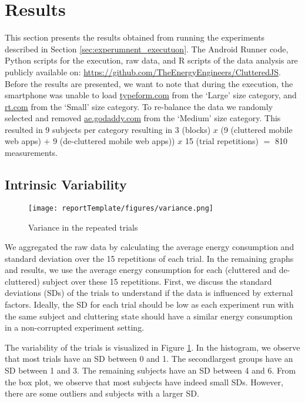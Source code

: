 \section{Results}\label{sec:results}

This section presents the results obtained from running the experiments described in Section \ref{sec:experumnent_executuon}. The Android Runner code, Python scripts for the execution, raw data, and R scripts of the data analysis are publicly available on:
\url{https://github.com/TheEnergyEngineers/ClutteredJS}. Before the results are presented, we want to note that during the execution, the smartphone was unable to load \url{typeform.com} from the `Large' size category, and \url{rt.com} from the `Small' size category. To re-balance the data we randomly selected and removed  \url{ae.godaddy.com} from the `Medium' size category. This resulted in 9 subjects per category resulting in 3 (blocks) $x$ (9 (cluttered mobile web apps) $+$ 9 (de-cluttered mobile web apps)) $x$ 15 (trial repetitions) $=$ 810 measurements.


\subsection{Intrinsic Variability}

\begin{figure}[h]
\centering
\texttt{[image: reportTemplate/figures/variance.png]}
\caption{Variance in the repeated trials} \label{fig:trial_variance}
\end{figure}

We aggregated the raw data by calculating the average energy consumption and standard deviation over the 15 repetitions of each trial. In the remaining graphs and results, we use the average energy consumption for each (cluttered and de-cluttered) subject over these 15 repetitions. First, we discuss the standard deviations (SDs) of the trials to understand if the data is influenced by external factors. Ideally, the SD for each trial should be low as each experiment run with the same subject and cluttering state should have a similar energy consumption in a non-corrupted experiment setting. 

\newpage

The variability of the trials is visualized in Figure \ref{fig:trial_variance}. In the histogram, we observe that most trials have an SD between 0 and 1. The second\-largest groups have an SD between 1 and 3. The remaining subjects have an SD between 4 and 6. From the box plot, we observe that most subjects have indeed small SDs. However, there are some outliers and subjects with a larger SD.

